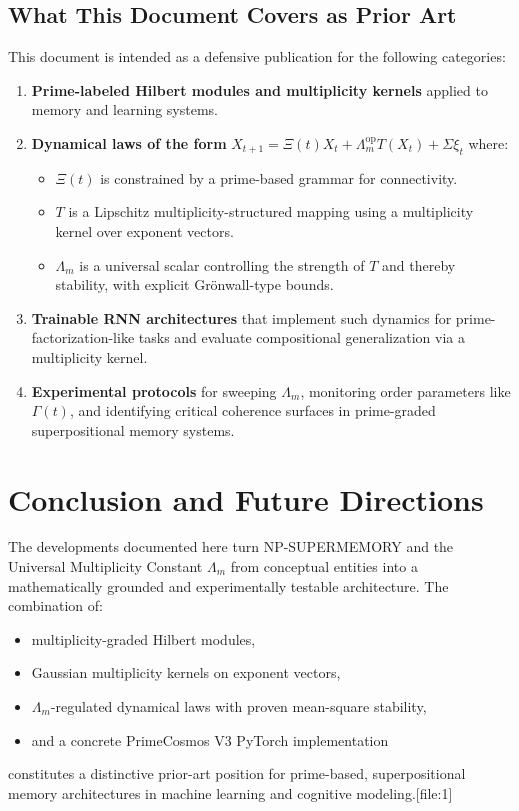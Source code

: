 \documentclass[11pt]{article}
\begin{document}
\subsection{What This Document Covers as Prior Art}

This document is intended as a defensive publication for the following categories:

\begin{enumerate}[leftmargin=1.5em]
\item \textbf{Prime-labeled Hilbert modules and multiplicity kernels} applied to memory and learning systems.
\item \textbf{Dynamical laws of the form} $X_{t+1}=\Xi(t)X_t+\Lambda_m^{\mathrm{op}}T(X_t)+\Sigma\xi_t$ where:
\begin{itemize}[leftmargin=0.8em]
\item $\Xi(t)$ is constrained by a prime-based grammar for connectivity.
\item $T$ is a Lipschitz multiplicity-structured mapping using a multiplicity kernel over exponent vectors.
\item $\Lambda_m$ is a universal scalar controlling the strength of $T$ and thereby stability, with explicit Grönwall-type bounds.
\end{itemize}
\item \textbf{Trainable RNN architectures} that implement such dynamics for prime-factorization-like tasks and evaluate compositional generalization via a multiplicity kernel.
\item \textbf{Experimental protocols} for sweeping $\Lambda_m$, monitoring order parameters like $\Gamma(t)$, and identifying critical coherence surfaces in prime-graded superpositional memory systems.
\end{enumerate}

\section{Conclusion and Future Directions}

The developments documented here turn NP-SUPERMEMORY and the Universal Multiplicity Constant $\Lambda_m$ from conceptual entities into a mathematically grounded and experimentally testable architecture. The combination of:
\begin{itemize}[leftmargin=1.5em]
\item multiplicity-graded Hilbert modules,
\item Gaussian multiplicity kernels on exponent vectors,
\item $\Lambda_m$-regulated dynamical laws with proven mean-square stability,
\item and a concrete PrimeCosmos V3 PyTorch implementation
\end{itemize}
constitutes a distinctive prior-art position for prime-based, superpositional memory architectures in machine learning and cognitive modeling.[file:1]
\end{document}
